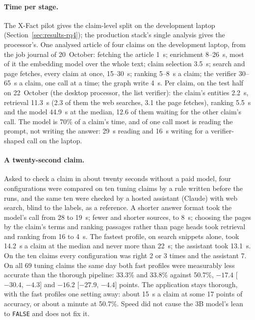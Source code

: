 \paragraph{Time per stage.} The X-Fact pilot gives the claim-level
split on the development laptop (Section~\ref{sec:results-rq4}); the
production stack's single analysis gives the processor's. One analysed
article of four claims on the development laptop, from the job journal
of 20~October: fetching the article 1~s; enrichment 8--26~s, most of it
the embedding model over the whole text; claim selection 3.5~s; search
and page fetches, every claim at once, 15--30~s; ranking 5--8~s a
claim; the verifier 30--65~s a claim, one call at a time; the graph
write 4~s. Per claim, on the test half on 22~October (the desktop
processor, the list verifier): the claim's entities 2.2~s, retrieval
11.3~s (2.3 of them the web searches, 3.1 the page fetches), ranking
5.5~s and the model 44.9~s at the median, 12.6 of them waiting for the
other claim's call. The model is 70\% of a claim's time, and of one
call most is reading the prompt, not writing the answer: 29~s reading
and 16~s writing for a verifier-shaped call on the laptop.

\paragraph{A twenty-second claim.} Asked to check a claim in about
twenty seconds without a paid model, four configurations were compared
on ten tuning claims by a rule written before the runs, and the same ten
were checked by a hosted assistant (Claude) with web search, blind to
the labels, as a reference. A shorter answer format took the model's
call from 28 to 19~s; fewer and shorter sources, to 8~s; choosing the
pages by the claim's terms and ranking passages rather than page heads
took retrieval and ranking from 16 to 4~s. The fastest profile, on
search snippets alone, took 14.2~s a claim at the median and never more
than 22~s; the assistant took 13.1~s. On the ten claims every
configuration was right 2 or 3 times and the assistant 7. On all 69
tuning claims the same day both fast profiles were measurably less
accurate than the thorough pipeline: 33.3\% and 33.8\% against 50.7\%,
$-17.4$ [$-30.4$, $-4.3$] and $-16.2$ [$-27.9$, $-4.4$] points. The
application stays thorough, with the fast profiles one setting away:
about 15~s a claim at some 17 points of accuracy, or about a minute at
50.7\%. Speed did not cause the 3B model's lean to \texttt{FALSE} and
does not fix it.

